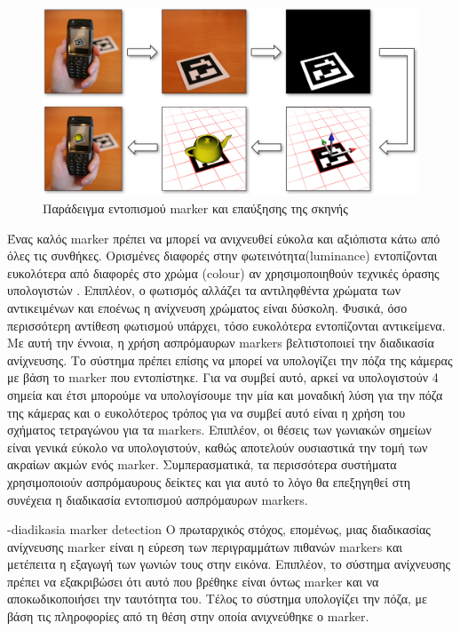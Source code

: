 \begin{figure}[H]
    \centering
    \includegraphics[scale=0.6, angle=0]{Files/Figures/HowMarkersWork.jpg}
    \caption[Παράδειγμα εντοπισμού marker και επαύξησης της σκηνής \cite{howmarkerswork}]{ Παράδειγμα εντοπισμού marker και επαύξησης της σκηνής \cite{howmarkerswork}}
    \label{fig:howmarkerswork}
\end{figure}


Ένας καλός marker πρέπει να μπορεί να ανιχνευθεί εύκολα και αξιόπιστα κάτω από όλες τις συνθήκες. Ορισμένες διαφορές στην φωτεινότητα(luminance) εντοπίζονται ευκολότερα από διαφορές στο χρώμα (colour) αν χρησιμοποιηθούν τεχνικές όρασης υπολογιστών \cite{hartley2003multiple} . Επιπλέον, ο φωτισμός αλλάζει τα αντιληφθέντα χρώματα των αντικειμένων και εποένως η ανίχνευση χρώματος είναι δύσκολη. Φυσικά, όσο περισσότερη αντίθεση φωτισμού υπάρχει, τόσο ευκολότερα εντοπίζονται αντικείμενα. Με αυτή την έννοια, η χρήση ασπρόμαυρων markers βελτιστοποιεί την διαδικασία ανίχνευσης. Το σύστημα πρέπει επίσης να μπορεί να υπολογίζει την πόζα της κάμερας με βάση το marker που εντοπίστηκε. Για να συμβεί αυτό, αρκεί να υπολογιστούν 4 σημεία και έτσι μπορούμε να υπολογίσουμε την μία και μοναδική λύση για την πόζα της κάμερας και ο ευκολότερος τρόπος για να συμβεί αυτό είναι η χρήση του σχήματος τετραγώνου για τα markers. Επιπλέον, οι θέσεις των γωνιακών σημείων είναι γενικά εύκολο να υπολογιστούν, καθώς αποτελούν ουσιαστικά την τομή των ακραίων ακμών ενός marker. Συμπερασματικά, τα περισσότερα συστήματα χρησιμοποιούν ασπρόμαυρους δείκτες και για αυτό το λόγο θα επεξηγηθεί στη συνέχεια η διαδικασία εντοπισμού ασπρόμαυρων markers.    






-diadikasia marker detection
Ο πρωταρχικός στόχος, επομένως, μιας διαδικασίας ανίχνευσης marker είναι η εύρεση των περιγραμμάτων πιθανών markers και μετέπειτα η εξαγωγή των γωνιών τους στην εικόνα. Επιπλέον, το σύστημα ανίχνευσης πρέπει να εξακριβώσει ότι αυτό που βρέθηκε είναι όντως marker και να αποκωδικοποιήσει την ταυτότητα του. Τέλος το σύστημα υπολογίζει την πόζα, με βάση τις πληροφορίες από τη θέση στην οποία ανιχνεύθηκε ο marker.

